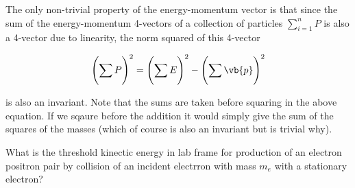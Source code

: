\documentclass[english,a4paper,12pt]{report}
\begin{document}
The only non-trivial property of the energy-momentum vector is that since the sum of the energy-momentum 4-vectors of a collection of particles \(\sum_{i=1}^{n} P\)  is also a 4-vector due to linearity, the norm squared of this 4-vector

\begin{equation}
    \left( \sum_{}^{} P \right)^2 = \left( \sum_{}^{} E \right) ^2 - \left( \sum_{}^{} \vb{p}   \right) ^2 
\end{equation}

is also an invariant. Note that the sums are taken before squaring in the above equation. If we sqaure before the addition it would simply give the sum of the squares of the masses (which of course is also an invariant but is trivial why).

{What is the threshold kinectic energy in lab frame for production of an electron positron pair by collision of an incident electrron with mass \(m_{e} \) with a stationary electron? }
\end{document}
